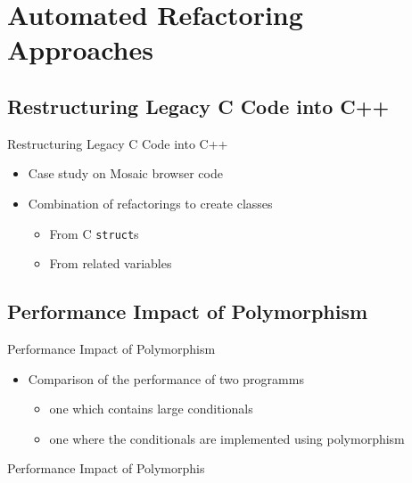 \documentclass{beamer}
\begin{document}
\section{Automated Refactoring Approaches}

\subsection{Restructuring Legacy C Code into C++}

\begin{frame}{Restructuring Legacy C Code into C++}
	
	\begin{itemize}
		\item Case study on Mosaic browser code
		\pause
		\item Combination of refactorings to create classes
		\begin{itemize}
			\item From C \texttt{struct}s
			\item From related variables
		\end{itemize}
	\end{itemize}
\end{frame}

\subsection{Performance Impact of Polymorphism}

\begin{frame}{Performance Impact of Polymorphism}
  
  \begin{itemize}
    \item Comparison of the performance of two programms
    \begin{itemize}
      \item one which contains large conditionals
      \item one where the conditionals are implemented using polymorphism
    \end{itemize}
  \end{itemize}
\end{frame}

\begin{frame}[fragile]{Performance Impact of Polymorphis}
	\begin{columns}[T]
		\begin{column}{.49\textwidth}
			
		\end{column}
		\begin{column}{.5\textwidth}
			
		\end{column}
	\end{columns}
\end{frame}
\end{document}
